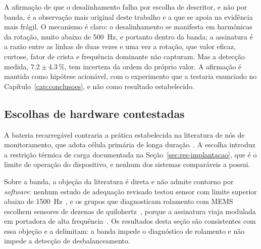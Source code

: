 A afirmação de que o desalinhamento falha por escolha de descritor, e não por banda, é a
observação mais original deste trabalho e a que se apoia na evidência mais frágil. O
mecanismo é claro: o desalinhamento se manifesta em harmônicas da rotação, muito abaixo de
\SI{500}{\hertz}, e portanto dentro da banda; a assinatura é a razão entre as linhas de
duas vezes e uma vez a rotação, que valor eficaz, curtose, fator de crista e frequência
dominante não capturam. Mas a detecção medida, $\num{7,2} \pm \num{4,3}\,\si{\percent}$\pM,
tem incerteza da ordem do próprio valor. A afirmação é mantida como hipótese acionável, com
o experimento que a testaria enunciado no Capítulo~\ref{cap:conclusoes}, e não como
resultado estabelecido.

\subsection{Escolhas de hardware contestadas}

A bateria recarregável contraria a prática estabelecida na literatura de nós de
monitoramento, que adota célula primária de longa duração~\cite{nabavi2025}. A escolha
introduz a restrição térmica de carga documentada na Seção~\ref{sec:res-implantacao}, que é
o limite de operação do dispositivo, e nenhum dos sistemas comparáveis a possui.

Sobre a banda, a objeção da literatura é direta e não admite contorno por
\emph{software}: nenhum estudo de adequação revisado testou sensor com limite superior
abaixo de \SI{1500}{\hertz}~\cite{albarbar2008}, e os grupos que diagnosticam rolamento com
MEMS escolhem sensores de dezenas de quilohertz~\cite{landi2023,jakobsen2024}, porque a
assinatura viaja modulada em portadora de alta frequência~\cite{randall2011,antoni2007}.
Os resultados desta seção são consistentes com essa objeção e a delimitam: a banda impede o
diagnóstico de rolamento e não impede a detecção de desbalanceamento.
